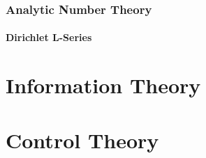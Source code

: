\documentclass{article}
\begin{document}
\section{Analytic Number Theory}\label{sec:analytic_number_theory}
\subsection{Dirichlet L-Series}\label{subsec:l_series}

\part{Information Theory}\label{sec:information_theory}

\part{Control Theory}\label{sec:control_theory}
\end{document}
